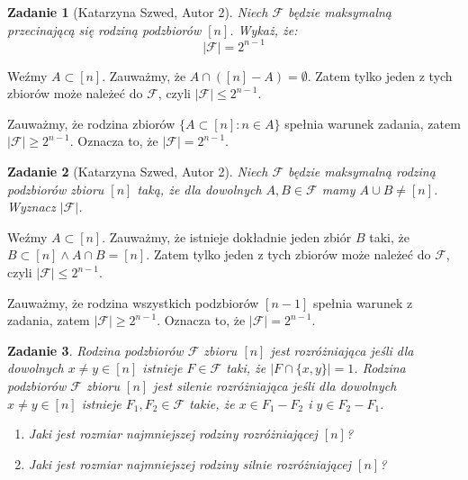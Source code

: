 \documentclass{mwart}
\newtheorem{zad}{Zadanie}[section]
\begin{document}
\begin{zad}[Katarzyna Szwed, Autor 2]
    Niech $\mathcal{F}$ będzie maksymalną przecinającą się rodziną podzbiorów $[n]$.
    Wykaż, że:
    \[ |\mathcal{F}| = 2^{n-1} \]
\end{zad}
\begin{mdframed}
    Weźmy $A \subset [n]$. Zauważmy, że $A \cap ([n] - A) = \emptyset$. 
    Zatem tylko jeden z tych zbiorów może należeć do $\mathcal{F}$, czyli $|\mathcal{F}| \leq 2^{n-1}$.

    Zauważmy, że rodzina zbiorów $\{A \subset [n] : n \in A\}$ spełnia warunek zadania, zatem $|\mathcal{F}| \geq 2^{n-1}$. 
    Oznacza to, że $|\mathcal{F}| = 2^{n-1}$.
\end{mdframed}
\begin{mdframed}

\end{mdframed}



\begin{zad}[Katarzyna Szwed, Autor 2]
    Niech $\mathcal{F}$ będzie maksymalną rodziną podzbiorów zbioru $[n]$ taką,
    że dla dowolnych $A, B \in \mathcal{F}$ mamy $A \cup B \neq [n]$. Wyznacz $|\mathcal{F}|$.
\end{zad}
\begin{mdframed}
    Weźmy $A \subset [n]$. Zauważmy, że istnieje dokładnie jeden zbiór $B$ taki, że $B \subset [n] \wedge A \cap B = [n]$. 
    Zatem tylko jeden z tych zbiorów może należeć do $\mathcal{F}$, czyli $|\mathcal{F}| \leq 2^{n-1}$.

    Zauważmy, że rodzina wszystkich podzbiorów $[n-1]$ spełnia warunek z zadania, zatem $|\mathcal{F}| \geq 2^{n-1}$. 
    Oznacza to, że $|\mathcal{F}| = 2^{n-1}$.
\end{mdframed}
\begin{mdframed}

\end{mdframed}


\begin{zad}
    Rodzina podzbiorów $\mathcal{F}$ zbioru $[n]$ jest rozróżniająca jeśli dla dowolnych
    $x \neq y \in [n]$ istnieje $F \in \mathcal{F }$ taki, że $|F \cap \{x,y\}| = 1$.
    Rodzina podzbiorów $\mathcal{F }$ zbioru $[n]$ jest silenie rozróżniająca jeśli dla
    dowolnych $ x \neq y \in [n]$ istnieje $F_1,F_2 \in \mathcal{F }$ takie, że $x \in F_1-F_2$ i $y \in F_2 - F_1$.
    \begin{enumerate}
        \item Jaki jest rozmiar najmniejszej rodziny rozróżniającej $[n]$?
        \item Jaki jest rozmiar najmniejszej rodziny silnie rozróżniającej $[n]$?
    \end{enumerate}
\end{zad}
\begin{mdframed}

\end{mdframed}
\begin{mdframed}

\end{mdframed}
\end{document}

